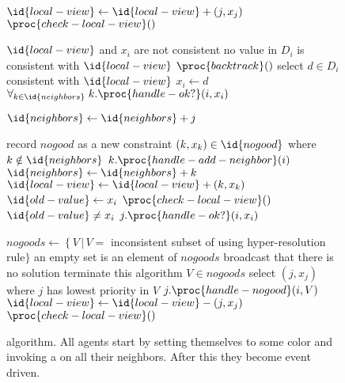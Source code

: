 \begin{SCfigure}
  \begin{minipage}{1.0\linewidth}
  \begin{codebox}
    \li $\id{local-view} \gets \id{local-view} + (j, x_j)$
    \li $\proc{check-local-view}()$
  \end{codebox}

  \begin{codebox}
    \li \If $\id{local-view}$ and $x_i$ are not consistent
    \li \Then \If no value in $D_i$ is consistent with $\id{local-view}$
    \li       \Then $\proc{backtrack}()$
    \li       \Else select $d \in D_{i}$ consistent with $\id{local-view}$
    \li       $x_i \gets d$
    \li       $\forall_{k \in \id{neighbors}} \;k.\proc{handle-ok?}(i,x_i)$
              \End
       \End
  \end{codebox}
  \begin{codebox}
    \li $\id{neighbors} \gets \id{neighbors} + j$
  \end{codebox}

  \begin{codebox}
    \li record $nogood$ as a new constraint
    \li \For $(k,x_k) \in \id{nogood}$ where $k \notin \id{neighbors}$
    \li \Do $k.\proc{handle-add-neighbor}(i)$
    \li $\id{neighbors} \gets \id{neighbors} + k$
    \li $\id{local-view} \gets \id{local-view} + (k,x_k)$
    \End
    \li $\id {old-value} \gets x_i$
    \li $\proc{check-local-view}()$
    \li \If $\id{old-value} \neq x_i$
    \li \Then $j.\proc{handle-ok?}(i,x_i)$
    \End
  \end{codebox}

  \begin{codebox}
    \li $nogoods \gets \left\{V\,|\,V=\right.$ inconsistent subset of
     using hyper-resolution rule$\}$
    \li \If an empty set is an element of $nogoods$
    \li \Then broadcast that there is no solution
    \li       terminate this algorithm
    \End
    \li \For $V \in nogoods$
    \li    \Do select $(j, x_j)$ where $j$ has lowest priority in $V$
    \li        $j.\proc{handle-nogood}(i,V)$
    \li        $\id{local-view} \gets \id{local-view} - (j, x_j)$
    \End
    \li $\proc{check-local-view}()$
  \end{codebox}
  \end{minipage}
  \caption{ algorithm. All agents start by setting
    themselves to some color and invoking a  on all
    their neighbors. After this they become event driven.}
  \label{fig:abt}
\end{SCfigure}

